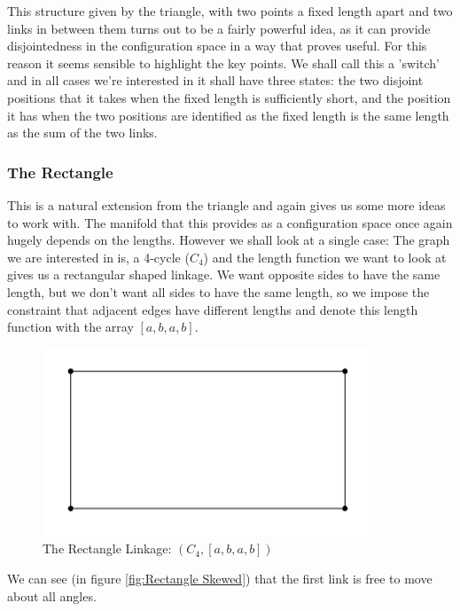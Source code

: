 \documentclass{article}
\begin{document}
\noindent This structure given by the triangle, with two points a fixed length apart and two links in between them turns out to be a fairly powerful idea, as it can provide disjointedness in the configuration space in a way that proves useful. For this reason it seems sensible to highlight the key points. We shall call this a 'switch' and in all cases we're interested in it shall have three states: the two disjoint positions that it takes when the fixed length is sufficiently short, and the position it has when the two positions are identified as the fixed length is the same length as the sum of the two links.

\subsubsection{The Rectangle}

This is a natural extension from the triangle and again gives us some more ideas to work with. The manifold that this provides as a configuration space once again hugely depends on the lengths. However we shall look at a single case: The graph we are interested in is, a 4-cycle ($C_4$) and the length function we want to look at gives us a rectangular shaped linkage. We want opposite sides to have the same length, but we don't want all sides to have the same length, so we impose the constraint that adjacent edges have different lengths and denote this length function with the array $[a,b,a,b]$.

\begin{figure}[h!]
\centering
\includegraphics[scale=0.5]{./images/rectangle.png}
\caption{The Rectangle Linkage: $(C_4, [a,b,a,b])$}
\label{fig:The Rectangle Linkage}
\end{figure}

\noindent We can see (in figure \ref{fig:Rectangle Skewed}) that the first link is free to move about all angles.
\end{document}
